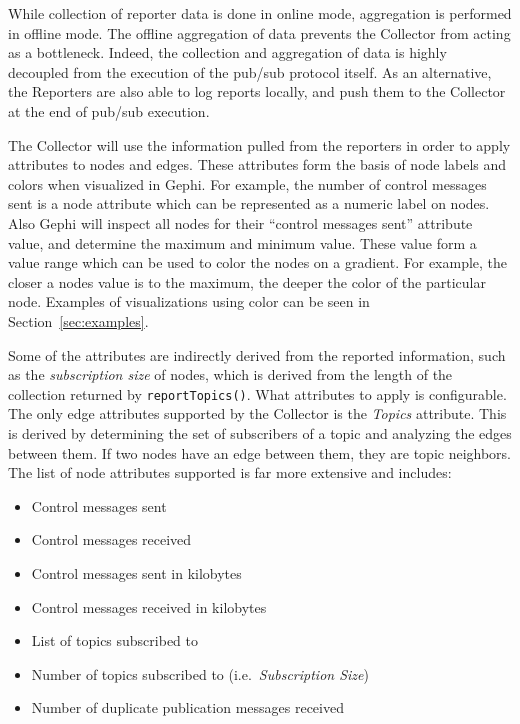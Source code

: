 While collection of reporter data is done in online mode, aggregation is performed in
offline mode. The offline aggregation of data prevents the Collector
from acting as a bottleneck. Indeed, the collection and aggregation of
data is highly decoupled from the execution of the pub/sub protocol
itself. As an alternative, the Reporters are also able to log reports
locally, and push them to the Collector at the end of pub/sub execution.

The Collector will use the information pulled from the reporters in
order to apply attributes to nodes and edges. These attributes form the
basis of node labels and colors when visualized in Gephi. For
example, the number of control messages sent is a node attribute which
can be represented as a numeric label on nodes. Also Gephi will inspect
all nodes for their ``control messages sent'' attribute value, and
determine the maximum and minimum value. These value form a value range
which can be used to color the nodes on a gradient. For example, the
closer a nodes value is to the maximum, the deeper the color of the
particular node. Examples of visualizations using color can be seen in
Section~\ref{sec:examples}.

Some of the attributes are indirectly derived from the reported information, such
as the \emph{subscription size} of nodes, which is derived from the length of the
collection returned by \texttt{reportTopics()}. What attributes to apply
is configurable. The only edge attributes supported by the Collector is
the \emph{Topics} attribute. This is derived by determining the set of
subscribers of a topic and analyzing the edges between them. If two
nodes have an edge between them, they are topic neighbors. The list of
node attributes supported is far more extensive and includes:

\begin{itemize}
    \item Control messages sent
    \item Control messages received
    \item Control messages sent in kilobytes
    \item Control messages received in kilobytes
    \item List of topics subscribed to
    \item Number of topics subscribed to (i.e.\ \emph{Subscription Size})
    \item Number of duplicate publication messages received
\end{itemize}

